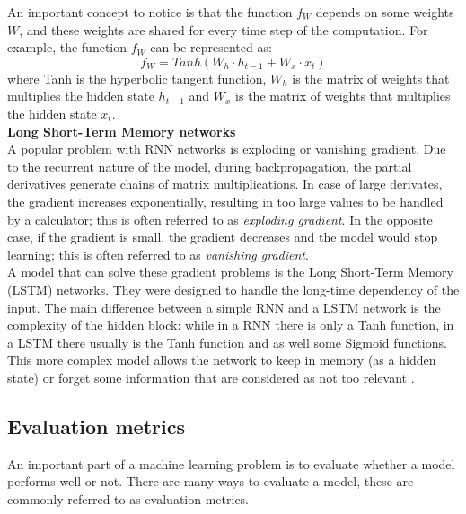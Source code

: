 An important concept to notice is that the function $f_W$ depends on some weights $W$, and these weights are shared for every time step of the computation. For example, the function $f_W$ can be represented as:
\begin{equation*}
    f_W = Tanh(W_h \cdot h_{t-1} + W_x \cdot x_{t})
\end{equation*}
\noindent where \gls{Tanh} is the hyperbolic tangent function, $W_h$ is the matrix of weights that multiplies the hidden state $h_{t-1}$ and $W_x$ is the matrix of weights that multiplies the hidden state $x_{t}$. \\

\noindent\textbf{Long Short-Term Memory networks}\\

\noindent A popular problem with \gls{RNN} networks is exploding or vanishing gradient. Due to the recurrent nature of the model, during backpropagation, the partial derivatives generate chains of matrix multiplications. In case of large derivates, the gradient increases exponentially, resulting in too large values to be handled by a calculator; this is often referred to as \emph{exploding gradient}. In the opposite case, if the gradient is small, the gradient decreases and the model would stop learning; this is often referred to as \emph{vanishing gradient}.\\

A model that can solve these gradient problems is the Long Short-Term Memory (\gls{LSTM}) networks. They were designed to handle the long-time dependency of the input. The main difference between a simple \gls{RNN} and a \gls{LSTM} network is the complexity of the hidden block: while in a \gls{RNN} there is only a \gls{Tanh} function, in a \gls{LSTM} there usually is the \gls{Tanh} function and as well some Sigmoid functions. \\
This more complex model allows the network to keep in memory (as a hidden state) or forget some information that are considered as not too relevant \cite{lstm}.

\subsection{Evaluation metrics}
\label{ssec:evalmetricSL}
An important part of a machine learning problem is to evaluate whether a model performs well or not. There are many ways to evaluate a model, these are commonly referred to as evaluation metrics.\\

